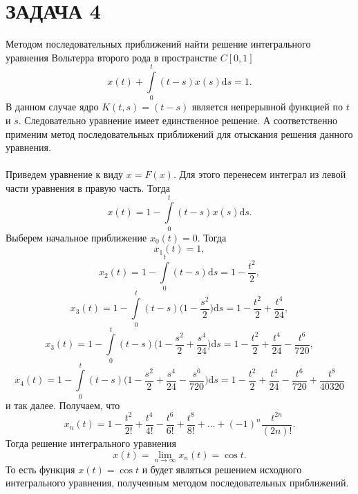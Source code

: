 \documentclass[a4paper, 12pt]{report}
\newcommand{\dif}{\mathrm{d}}
\begin{document}
		\section*{ЗАДАЧА 4}
		Методом последовательных приближений найти решение интегрального уравнения Вольтерра второго рода в пространстве $C[0,1]$
		$$x(t) + \int\limits_0^t (t-s)x(s)\dif s = 1.$$
		В данном случае ядро $K(t,s) = (t-s)$ является непрерывной функцией по $t$ и $s$. Следовательно уравнение имеет единственное решение. А соответственно применим метод последовательных приближений для отыскания решения данного уравнения.\\\\
		Приведем уравнение к виду $x = F(x)$. Для этого перенесем интеграл из левой части уравнения в правую часть. Тогда $$x(t) = 1-\int\limits_0^t (t-s)x(s)\dif s.$$
		Выберем начальное приближение $x_0(t) = 0$. Тогда $$x_1(t) = 1,$$
		$$x_2(t) = 1-\int\limits_0^t (t-s)\dif s = 1 - \dfrac{t^2}{2},$$
		$$x_3(t) = 1-\int\limits_0^t (t-s)\Big(1 - \dfrac{s^2}{2}\Big)\dif s = 1 - \dfrac{t^2}{2} + \dfrac{t^4}{24},$$
		$$x_3(t) = 1-\int\limits_0^t (t-s)\Big(1 - \dfrac{s^2}{2} + \dfrac{s^4}{24}\Big)\dif s = 1 - \dfrac{t^2}{2} + \dfrac{t^4}{24} - \dfrac{t^6}{720},$$
		$$x_4(t) = 1-\int\limits_0^t (t-s)\Big(1 - \dfrac{s^2}{2} + \dfrac{s^4}{24} - \dfrac{s^6}{720}\Big)\dif s = 1 - \dfrac{t^2}{2} + \dfrac{t^4}{24} - \dfrac{t^6}{720} + \dfrac{t^8}{40320}$$
		и так далее. Получаем, что $$x_n(t) = 1 - \dfrac{t^2}{2!} + \dfrac{t^4}{4!} - \dfrac{t^6}{6!} + \dfrac{t^8}{8!} + \ldots + (-1)^n\dfrac{t^{2n}}{(2n)!}.$$
		Тогда решение интегрального уравнения $$x(t) = \lim\limits_{n\to\infty} x_n(t) = \cos t.$$
		То есть функция $x(t) = \cos t$ и будет являться решением исходного интегрального уравнения, полученным методом последовательных приближений.
\end{document}
